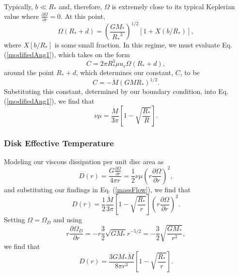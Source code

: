\documentclass[aps,pra,twocolumn]{revtex4-1}
\begin{document}
Typically, $b \ll R_*$ and, therefore, $\Omega$ is extremely close to its typical Keplerian value where $\frac{\partial \Omega}{\partial r} = 0$.  At this point,
\begin{equation}
\Omega(R_* + d) = \left(\frac{GM_*}{{R_*}^3} \right)^{1/2} \left[1 + X(b/R_*) \right],
\end{equation}
where $X[b/R_*]$ is some small fraction.  In this regime, we must evaluate Eq. (\ref{modifiedAng1}), which takes on the form
\begin{equation}
C = 2\pi R_*^3 \mu u_r \Omega(R_* + d) , \nonumber
\end{equation}
around the point $R_* + d$, which determines our constant, $C$, to be
\begin{equation}
C = - \dot{M}(G M R_*)^{1/2}. \nonumber
\end{equation}
Substituting this constant, determined by our boundary condition, into Eq. (\ref{modifiedAng1}), we find that
\begin{equation}
\nu \mu = \frac{\dot{M}}{3\pi}\left[ 1 - \sqrt{\frac{R_*}{R}} \right]. \label{massFlow}
\end{equation}


\subsubsection{\label{section 2.2.2} Disk Effective Temperature}
Modeling our viscous dissipation per unit disc area as \cite{king2002}
\begin{equation}
D(r) = \frac{G \frac{\partial\Omega}{\partial r}}{4\pi r}= \frac{1}{2}\nu \mu (r\frac{\partial\Omega}{\partial r})^2,
\end{equation}
and substituting our findings in Eq. (\ref{massFlow}), we find that
\begin{equation}
D(r) =\frac{1}{2}\frac{\dot{M}}{3\pi}\left[ 1 - \sqrt{\frac{R_*}{r}} \right] (r\frac{\partial\Omega}{\partial r})^2. \nonumber
\end{equation}
Setting $\Omega = \Omega_D$ and using
\begin{equation}
r\frac{\partial\Omega_D}{\partial r} = -r\frac{3}{2}\sqrt{G M_*}r^{-5/2} = -\frac{3}{2}\sqrt{\frac{G M_*}{r^3}},
\end{equation}
we find that
\begin{equation}
D(r) = \frac{3GM_*\dot{M}}{8\pi r^3}\left[ 1 - \sqrt{\frac{R_*}{r}} \right].
\end{equation}
\end{document}
